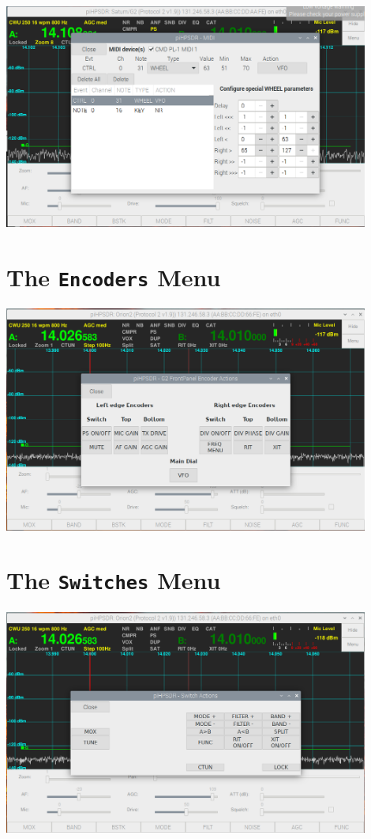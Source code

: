 \documentclass[12pt]{book}
\begin{document}
\begin{center}
\includegraphics[width=12cm]{MIDImenu3.png}
\end{center}
 
\section{The \texttt{Encoders} Menu}
\begin{center}
\includegraphics[width=12cm]{EncodersMenu.png}
\end{center}

\section{The \texttt{Switches} Menu}
\begin{center}
\includegraphics[width=12cm]{SwitchesMenu.png}
\end{center}
\end{document}

